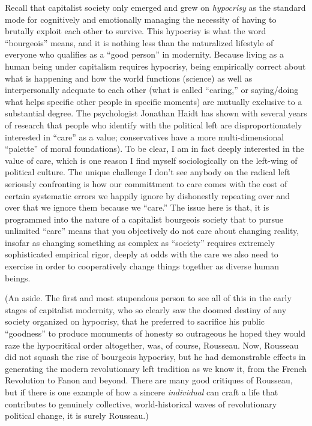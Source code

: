 \documentclass[a4paper,12pt,margin=.5in]{article}
\begin{document}
Recall that capitalist society only emerged and grew on \emph{hypocrisy}
as the standard mode for cognitively and emotionally managing the
necessity of having to brutally exploit each other to survive. This
hypocrisy is what the word ``bourgeois'' means, and it is nothing less
than the naturalized lifestyle of everyone who qualifies as a ``good
person'' in modernity. Because living as a human being under capitalism
requires hypocrisy, being empirically correct about what is happening
and how the world functions (science) as well as interpersonally
adequate to each other (what is called ``caring,'' or saying/doing what
helps specific other people in specific moments) are mutually exclusive
to a substantial degree. The psychologist Jonathan Haidt has shown with
several years of research that people who identify with the political
left are disproportionately interested in ``care'' as a value;
conservatives have a more multi-dimensional ``palette'' of moral
foundations). To be clear, I am in fact deeply interested in the value
of care, which is one reason I find myself sociologically on the
left-wing of political culture. The unique challenge I don't see anybody
on the radical left seriously confronting is how our committment to care
comes with the cost of certain systematic errors we happily ignore by
dishonestly repeating over and over that we ignore them because we
``care.'' The issue here is that, it is programmed into the nature of a
capitalist bourgeois society that to pursue unlimited ``care'' means
that you objectively do not care about changing reality, insofar as
changing something as complex as ``society'' requires extremely
sophisticated empirical rigor, deeply at odds with the care we also need
to exercise in order to cooperatively change things together as diverse
human beings.

(An aside. The first and most stupendous person to see all of this in
the early stages of capitalist modernity, who so clearly saw the doomed
destiny of any society organized on hypocrisy, that he preferred to
sacrifice his public ``goodness'' to produce monuments of honesty so
outrageous he hoped they would raze the hypocritical order altogether,
was, of course, Rousseau. Now, Rousseau did not squash the rise of
bourgeois hypocrisy, but he had demonstrable effects in generating the
modern revolutionary left tradition as we know it, from the French
Revolution to Fanon and beyond. There are many good critiques of
Rousseau, but if there is one example of how a sincere \emph{individual}
can craft a life that contributes to genuinely collective,
world-historical waves of revolutionary political change, it is surely
Rousseau.)
\end{document}
